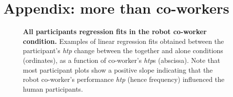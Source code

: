 \chapter{Appendix: more than co-workers}

\begin{figure}
	\caption{{\bf All participants regression fits in the robot co-worker condition.} Examples of linear regression fits obtained between the participant's {\it htp} change between the together and alone conditions (ordinates), as a function of co-worker's {\it htp}s (abscissa).  Note that most participant plots show a positive slope indicating that the robot co-worker's performance {\it htp} (hence frequency) influenced the human participants.}
	\label{S1_Fig}
\end{figure}


